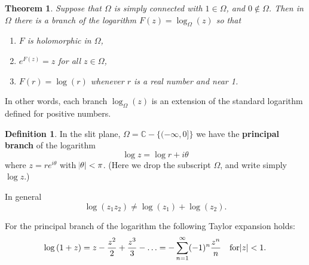 \documentclass{article}
\newtheorem{theorem}{Theorem}
\theoremstyle{definition}
\newtheorem{definition}{Definition}[section]
\theoremstyle{remark}
\begin{document}
    \begin{theorem}
        Suppose that $\Omega$ is simply connected with $1\in\Omega$, and $0\not\in\Omega$. Then in $\Omega$ there is a branch
        of the logarithm $F(z) = \log_{\Omega}(z)$ so that
        \begin{enumerate}
            \item $F$ is holomorphic in $\Omega$,
            \item $e^{F(z)} = z$ for all $z\in\Omega$,
            \item $F(r) = \log(r)$ whenever $r$ is a real number and near 1.
        \end{enumerate}
    \end{theorem}

    In other words, each branch $\log_{\Omega}(z)$ is an extension of the standard logarithm defined for positive numbers.

    \begin{definition}
        In the slit plane, $\Omega = \mathbb{C} - \{(-\infty,0]\}$ we have the \textbf{principal branch} of the logarithm
        \[ \log{z} = \log{r} + i\theta \]
        where $z=re^{i\theta}$ with $\abs{\theta}<\pi$. (Here we drop the subscript $\Omega$, and write simply $\log{z}$.)
    \end{definition}

    In general
    \[ \log(z_1z_2) \neq \log(z_1) + \log(z_2). \]

    For the principal branch of the logarithm the following Taylor expansion holds:
    \begin{align}
        \log{(1+z)} = z - \frac{z^2}{2} + \frac{z^3}{3} - \hdots = -\sum_{n=1}^{\infty} (-1)^n\frac{z^n}{n}\quad\text{for}\abs{z}<1.
    \end{align}
\end{document}
